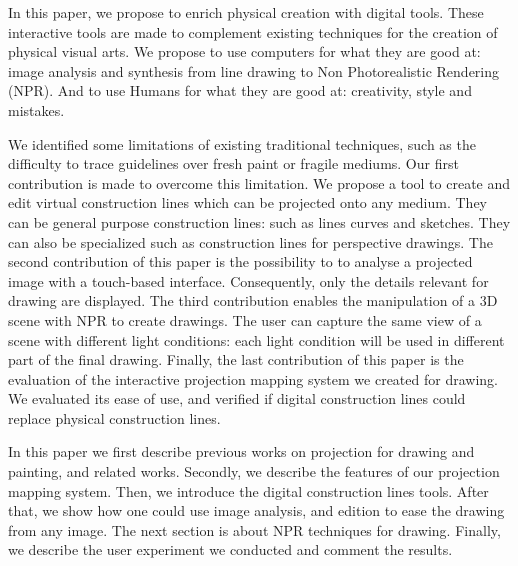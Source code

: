 \documentclass{sigchi}
\begin{document}
In this paper, we propose to enrich physical creation with digital
tools. These interactive tools are made to complement existing
techniques for the creation of physical visual arts. 
We propose to use computers for what they
are good at: image analysis and synthesis from line drawing to Non
Photorealistic Rendering (NPR). And to use Humans for what they are
good at: creativity, style and mistakes. 


We identified some limitations of existing traditional techniques, such as the
difficulty to trace guidelines over fresh paint or fragile mediums. 
Our first contribution is made to overcome this limitation. 
We propose a tool to create and edit
virtual construction lines which can be projected onto any medium. 
They can be general purpose construction lines: such as lines curves
and sketches. They can also be specialized such as construction lines
for perspective drawings. 
The second contribution of this paper is the possibility to 
to analyse a projected image with a touch-based interface. Consequently, 
only the details relevant for drawing are displayed. 
The third contribution enables the manipulation of a 3D
scene with NPR to create drawings. The user can capture the same view
of a scene with different light conditions: each light condition will
be used in different part of the final drawing. 
Finally, the last contribution of this paper is the evaluation of
the interactive projection mapping system we created for drawing. 
We evaluated its ease of use, and verified if digital construction
lines could replace physical construction lines. 



 

In this paper we first describe previous works on projection for drawing and
painting, and related works. Secondly, we describe the features of
our projection mapping system. Then, we introduce the digital
construction lines tools. After that, we show how one could use image
analysis, and edition to ease the drawing from any image. 
The next section is about NPR techniques for drawing. 
Finally, we describe the user experiment we conducted and
comment the results. 
\end{document}

